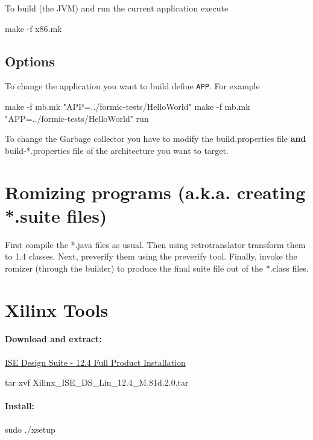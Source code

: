 \documentclass[
a4paper,
12pt,
]{report}
\begin{document}
To build (the JVM) and run the current application execute

\begin{bash}
make -f x86.mk
\end{bash}

\subsection{Options}
To change the application you want to build define \verb!APP!. For
example

\begin{bash}
make -f mb.mk "APP=../formic-tests/HelloWorld"
make -f mb.mk "APP=../formic-tests/HelloWorld" run
\end{bash}

To change the Garbage collector you have to modify the
build.properties file \textbf{and} build-*.properties file of the
architecture you want to target.

\section{Romizing programs (a.k.a. creating *.suite files)}

First compile the *.java files as usual. Then using retrotranslator
transform them to 1.4 classes. Next, preverify them using the
preverify tool. Finally, invoke the romizer (through the builder) to
produce the final suite file out of the *.class files.

\section{Xilinx Tools}
\label{sec:xilinx-tools}

\paragraph{Download and extract:}
\href{http://www.xilinx.com/support/download/index.html/content/xilinx/en/downloadNav/design-tools/v12_4.html)}
{ISE  Design Suite - 12.4 Full Product Installation}

\begin{bash}
tar xvf Xilinx_ISE_DS_Lin_12.4_M.81d.2.0.tar
\end{bash}

\paragraph{Install:}
\begin{bash}
sudo ./xsetup
\end{bash}
\end{document}
